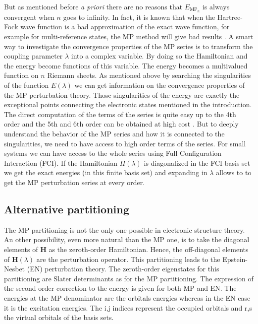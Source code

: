 \documentclass[11pt,a4paper]{article}
\newcommand{\bH}{\mathbf{H}}
\begin{document}
But as mentioned before \textit{a priori} there are no reasons that $E_{\text{MP}_{n}}$ is always convergent when $n$ goes to infinity. In fact, it is known that when the Hartree-Fock wave function is a bad approximation of the exact wave function, for example for multi-reference states, the MP method will give bad results \cite{Gill_1986, Gill_1988, Handy_1985, Lepetit_1988}. A smart way to investigate the convergence properties of the MP series is to transform the coupling parameter $\lambda$ into a complex variable. By doing so the Hamiltonian and the energy become functions of this variable. The energy becomes a multivalued function on $n$ Riemann sheets. As mentioned above by searching the singularities of the function $E(\lambda)$ we can get information on the convergence properties of the MP perturbation theory. Those singularities of the energy are exactly the exceptional points connecting the electronic states mentioned in the introduction. The direct computation of the terms of the series is quite easy up to the 4th order and the 5th and 6th order can be obtained at high cost \cite{JensenBook}. But to deeply understand the behavior of the MP series and how it is connected to the singularities, we need to have access to high order terms of the series. For small systems we can have access to the whole series using Full Configuration Interaction (FCI). If the Hamiltonian $H(\lambda)$ is diagonalized in the FCI basis set we get the exact energies (in this finite basis set) and expanding in $\lambda$ allows to to get the MP perturbation series at every order.

\subsection{Alternative partitioning}\label{sec:AlterPart}

The MP partitioning is not the only one possible in electronic structure theory. An other possibility, even more natural than the MP one, is to take the diagonal elements of $\bH$ as the zeroth-order Hamiltonian. Hence, the off-diagonal elements of $\bH(\lambda)$ are the perturbation operator. This partitioning leads to the Epstein-Nesbet (EN) perturbation theory. The zeroth-order eigenstates for this partitioning are Slater determinants as for the MP partitioning. The expression of the second order correction to the energy is given for both MP and EN. The energies at the MP denominator are the orbitals energies whereas in the EN case it is the excitation energies. The i,j indices represent the occupied orbitals and r,s the virtual orbitals of the basis sets.
\end{document}
